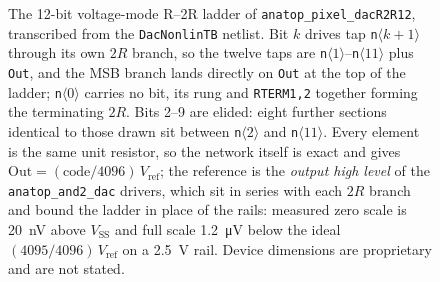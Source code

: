 \begin{figure}[htbp]
{\begin{circuitikz}
\end{circuitikz}
  }
  \caption[{The 12-bit voltage-mode R-2R ladder.}]{The 12-bit voltage-mode R--2R ladder of \texttt{anatop\_pixel\_dacR2R12}, transcribed from the \texttt{DacNonlinTB} netlist. Bit $k$ drives tap \texttt{n}$\langle k{+}1\rangle$ through its own $2R$ branch, so the twelve taps are \texttt{n}$\langle 1\rangle$--\texttt{n}$\langle 11\rangle$ plus \texttt{Out}, and the MSB branch lands directly on \texttt{Out} at the top of the ladder; \texttt{n}$\langle 0\rangle$ carries no bit, its rung and \texttt{RTERM1,2} together forming the terminating $2R$. Bits 2--9 are elided: eight further sections identical to those drawn sit between \texttt{n}$\langle 2\rangle$ and \texttt{n}$\langle 11\rangle$. Every element is the same unit resistor, so the network itself is exact and gives $\mathrm{Out}=(\mathrm{code}/4096)\,V_{\mathrm{ref}}$; the reference is the \emph{output high level} of the \texttt{anatop\_and2\_dac} drivers, which sit in series with each $2R$ branch and bound the ladder in place of the rails: measured zero scale is \SI{20}{\nano\volt} above $V_{\mathrm{SS}}$ and full scale \SI{1.2}{\micro\volt} below the ideal $(4095/4096)\,V_{\mathrm{ref}}$ on a \SI{2.5}{\volt} rail. Device dimensions are proprietary and are not stated.}
  \label{fig:dacr2r12-ladder}
\end{figure}
